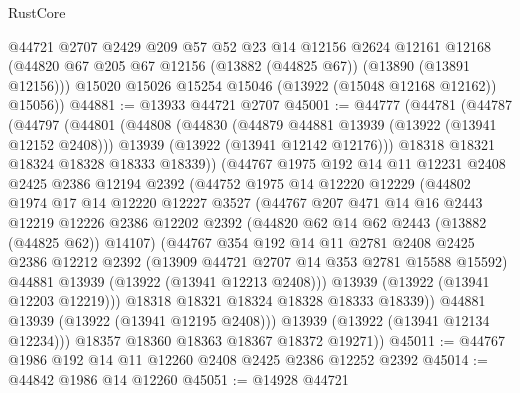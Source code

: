 \begin{lexlean}{RustCore}
\begin{coremodule}
        @44721
        @2707
        @2429
        @209
        @57
        @52
        @23
        @14
        @12156
        @2624
        @12161
        @12168
        (@44820 @67 @205 @67 @12156 (@13882 (@44825 @67)) (@13890 (@13891 @12156)))
        @15020
        @15026
        @15254
        @15046
        (@13922 (@15048 @12168 @12162))
        @15056))
@44881 := @13933 @44721 @2707
@45001 := @44777
    (@44781
      (@44787
        (@44797
          (@44801
            (@44808
              (@44830
                (@44879 @44881 @13939 (@13922 (@13941 @12152 @2408)))
                @13939
                (@13922 (@13941 @12142 @12176)))
              @18318
              @18321
              @18324
              @18328
              @18333
              @18339))
          (@44767
            @1975
            @192
            @14
            @11
            @12231
            @2408
            @2425
            @2386
            @12194
            @2392
            (@44752
              @1975
              @14
              @12220
              @12229
              (@44802
                @1974
                @17
                @14
                @12220
                @12227
                @3527
                (@44767
                  @207
                  @471
                  @14
                  @16
                  @2443
                  @12219
                  @12226
                  @2386
                  @12202
                  @2392
                  (@44820 @62 @14 @62 @2443 (@13882 (@44825 @62)) @14107)
                  (@44767
                    @354
                    @192
                    @14
                    @11
                    @2781
                    @2408
                    @2425
                    @2386
                    @12212
                    @2392
                    (@13909 @44721 @2707 @14 @353 @2781 @15588 @15592)
                    @44881
                    @13939
                    (@13922 (@13941 @12213 @2408)))
                  @13939
                  (@13922 (@13941 @12203 @12219)))
                @18318
                @18321
                @18324
                @18328
                @18333
                @18339))
            @44881
            @13939
            (@13922 (@13941 @12195 @2408)))
          @13939
          (@13922 (@13941 @12134 @12234)))
        @18357
        @18360
        @18363
        @18367
        @18372
        @19271))
@45011 := @44767 @1986 @192 @14 @11 @12260 @2408 @2425 @2386 @12252 @2392
@45014 := @44842 @1986 @14 @12260
@45051 := @14928
    @44721

\end{coremodule}
\end{lexlean}
